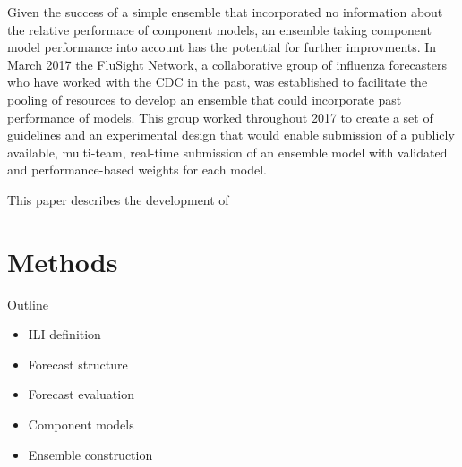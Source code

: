 \documentclass{article}
\begin{document}
Given the success of a simple ensemble that incorporated no information about the relative performace of component models, an ensemble taking component model performance into account has the potential for further improvments. In March 2017 the FluSight Network, a collaborative group of influenza forecasters who have worked with the CDC in the past, was established to facilitate the pooling of resources to develop an ensemble that could incorporate past performance of models. This group worked throughout 2017 to create a set of guidelines and an experimental design that would enable submission of a publicly available, multi-team, real-time submission of an ensemble model with validated and performance-based weights for each model. 

This paper describes the development of 




% 
% 
% 


\section{Methods}

Outline
\begin{itemize}
    \item ILI definition
    \item Forecast structure
    \item Forecast evaluation
    \item Component models
    \item Ensemble construction
\end{itemize}
\end{document}
